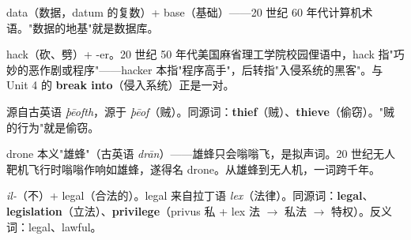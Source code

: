 \documentclass[../main.tex]{subfiles}
\begin{document}


\begin{origin}
data（数据，datum 的复数）+ base（基础）——20 世纪 60 年代计算机术语。"数据的地基"就是数据库。
\end{origin}



\begin{origin}
hack（砍、劈）+ -er。20 世纪 50 年代美国麻省理工学院校园俚语中，hack 指"巧妙的恶作剧或程序"——hacker 本指"程序高手"，后转指"入侵系统的黑客"。与 Unit 4 的 \textbf{break into}（侵入系统）正是一对。
\end{origin}



\begin{origin}
源自古英语 \textit{þēofth}，源于 \textit{þēof}（贼）。同源词：\textbf{thief}（贼）、\textbf{thieve}（偷窃）。"贼的行为"就是偷窃。
\end{origin}



\begin{origin}
drone 本义"雄蜂"（古英语 \textit{drān}）——雄蜂只会嗡嗡飞，是拟声词。20 世纪无人靶机飞行时嗡嗡作响如雄蜂，遂得名 drone。从雄蜂到无人机，一词跨千年。
\end{origin}



\begin{origin}
\textit{il-}（不）+ legal（合法的）。legal 来自拉丁语 \textit{lex}（法律）。同源词：\textbf{legal}、\textbf{legislation}（立法）、\textbf{privilege}（privus 私 + lex 法 $\to$ 私法 $\to$ 特权）。反义词：legal、lawful。
\end{origin}

\end{document}
